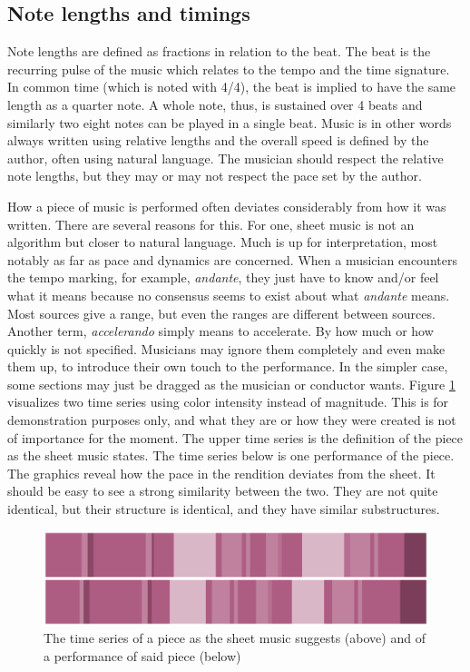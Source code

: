 \subsection{Note lengths and timings}
Note lengths are defined as fractions in relation to the beat. The beat is the recurring pulse of the music which relates to the tempo and the time signature. In common time (which is noted with 4/4), the beat is implied to have the same length as a quarter note. A whole note, thus, is sustained over 4 beats and similarly two eight notes can be played in a single beat. Music is in other words always written using relative lengths and the overall speed is defined by the author, often using natural language. The musician should respect the relative note lengths, but they may or may not respect the pace set by the author.  

How a piece of music is performed often deviates considerably from how it was written. There are several reasons for this. For one, sheet music is not an algorithm but closer to natural language. Much is up for interpretation, most notably as far as pace and dynamics are concerned. When a musician encounters the tempo marking, for example, \textit{andante}, they just have to know and/or feel what it means because no consensus seems to exist about what \textit{andante} means. Most sources give a range, but even the ranges are different between sources. Another term, \textit{accelerando} simply means to accelerate. By how much or how quickly is not specified. Musicians may ignore them completely and even make them up, to introduce their own touch to the performance. In the simpler case, some sections may just be dragged as the musician or conductor wants. Figure \ref{fig:performance-sheet} visualizes two time series using color intensity instead of magnitude. This is for demonstration purposes only, and what they are or how they were created is not of importance for the moment. The upper time series is the definition of the piece as the sheet music states. The time series below is one performance of the piece. The graphics reveal how the pace in the rendition deviates from the sheet. It should be easy to see a strong similarity between the two. They are not quite identical, but their structure is identical, and they have similar substructures. 

\begin{figure}[ht]
    \centering
    \includegraphics[width=\textwidth]{./images/performance-sheet.png}
    \caption{The time series of a piece as the sheet music suggests (above) and of a performance of said piece (below)\label{fig:performance-sheet}}
\end{figure}

